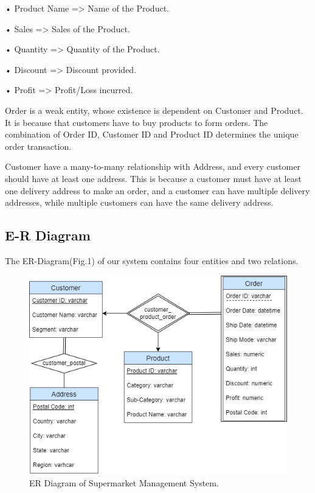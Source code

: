 • Product Name => Name of the Product. \par
• Sales => Sales of the Product. \par
• Quantity => Quantity of the Product. \par
• Discount => Discount provided. \par
• Profit => Profit/Loss incurred. \par
Order is a weak entity, whose existence is dependent on Customer and Product. It is because that customers have to buy products to form orders. The combination of Order ID, Customer ID and Product ID determines the unique order transaction. \par
Customer have a many-to-many relationship with Address, and every customer should have at least one address. This is because a customer must have at least one delivery address to make an order, and a customer can have multiple delivery addresses, while multiple customers can have the same delivery address.

\subsection{E-R Diagram}
\label{sect:sub-title}
The ER-Diagram(Fig.1) of our system contains four entities and two relations.
\begin{figure}[H]
    \centering
    \includegraphics[width=\columnwidth]{images/ER.png}
    \caption[Short text]{ER Diagram of Supermarket Management System.}
    \label{fig:ER}
\end{figure}

